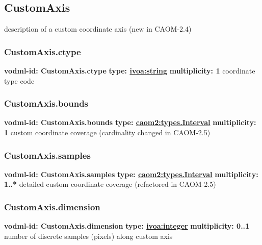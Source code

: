   \subsection{CustomAxis}
  \label{sect:CustomAxis}
    description of a custom coordinate axis (new in CAOM-2.4)

    \subsubsection{CustomAxis.ctype}
      \textbf{vodml-id: CustomAxis.ctype} \newline
      \textbf{type: \hyperref[sect:ivoa]{ivoa:string}} \newline
      \textbf{multiplicity: 1} \newline
      coordinate type code

    \subsubsection{CustomAxis.bounds}
      \textbf{vodml-id: CustomAxis.bounds} \newline
      \textbf{type: \hyperref[sect:types.Interval]{caom2:types.Interval}} \newline
      \textbf{multiplicity: 1} \newline
      custom coordinate coverage (cardinality changed in CAOM-2.5)

    \subsubsection{CustomAxis.samples}
      \textbf{vodml-id: CustomAxis.samples} \newline
      \textbf{type: \hyperref[sect:types.Interval]{caom2:types.Interval}} \newline
      \textbf{multiplicity: 1..*} \newline
      detailed custom coordinate coverage (refactored in CAOM-2.5)

    \subsubsection{CustomAxis.dimension}
      \textbf{vodml-id: CustomAxis.dimension} \newline
      \textbf{type: \hyperref[sect:ivoa]{ivoa:integer}} \newline
      \textbf{multiplicity: 0..1} \newline
      number of discrete samples (pixels) along custom axis

